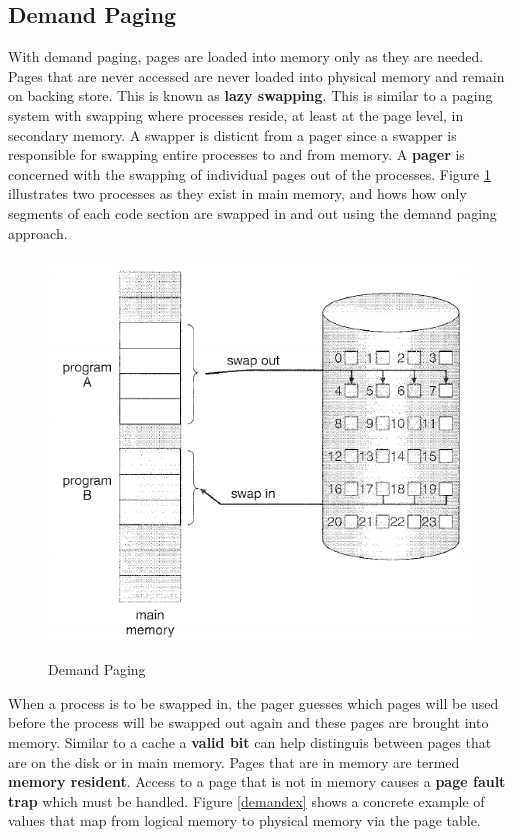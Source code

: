 \documentclass[10pt,a4paper]{article}
\begin{document}
\subsection{Demand Paging}
With demand paging, pages are loaded into memory only as they are needed. Pages that are never accessed are never loaded into physical memory and remain on backing store. This is known as {\bf lazy swapping}. This is similar to a paging system with swapping where processes reside, at least at the page level, in secondary memory. A swapper is disticnt from a pager since a swapper is responsible for swapping entire processes to and from memory. A {\bf pager} is concerned with the swapping of individual pages out of the processes. Figure \ref{demandpaging} illustrates two processes as they exist in main memory, and hows how only segments of each code section are swapped in and out using the demand paging approach. 
\begin{figure}
\caption{Demand Paging \cite{OSCONCEPTS}}
\begin{center}
\includegraphics[scale=0.45]{../images/demand-paging.png}
\label{demandpaging}
\end{center}
\end{figure}
When a process is to be swapped in, the pager guesses which pages will be used before the process will be swapped out again and these pages are brought into memory. Similar to a cache a {\bf valid bit} can help distinguis between pages that are on the disk or in main memory.  Pages that are in memory are termed {\bf memory resident}. Access to a page that is not in memory causes a {\bf page fault trap} which must be handled. Figure \ref{demandex} shows a concrete example of values that map from logical memory to physical memory via the page table. 
\end{document}
